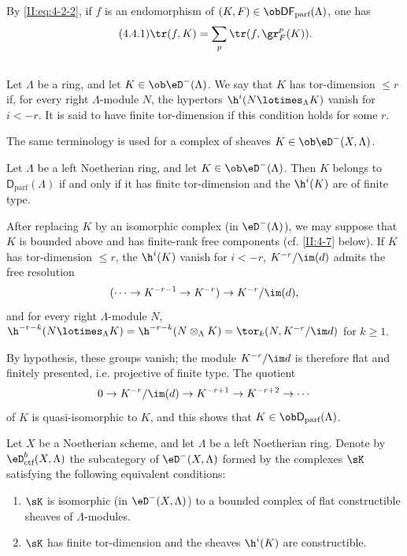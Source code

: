 \documentclass[oneside]{book}
\begin{document}
By \eqref{II:eq:4-2-2}, if $f$ is an endomorphism of
$(K,F)\in\ob\mathsf{DF}_\text{parf}(\Lambda)$, one has
\begin{equation*}\tag{4.4.1}\label{II:eq:4-4-1}
 \tr(f,K) = \sum_p \tr(f,\gr_F^p(K)) \text{.}
\end{equation*}






\subsection{}\label{II:4-5}

Let $\Lambda$ be a ring, and let $K\in\ob\eD^-(\Lambda)$. We say that $K$
has tor-dimension $\leqslant r$ if, for every right $\Lambda$-module $N$, the
hypertors $\h^i(N\lotimes_\Lambda K)$ vanish for $i<-r$. It is said to have
finite tor-dimension if this condition holds for some $r$.

The same terminology is used for a complex of sheaves
$K\in\ob\eD^-(X,\Lambda)$.






\begin{lemma}\label{II:4-5-1}
Let $\Lambda$ be a left Noetherian ring, and let
$K\in\ob\eD^-(\Lambda)$. Then $K$ belongs to
$\mathsf{D}_\text{parf}(\Lambda)$ if and only if it has finite tor-dimension
and the $\h^i(K)$ are of finite type.
\end{lemma}

After replacing $K$ by an isomorphic complex (in $\eD^-(\Lambda)$), we may
suppose that $K$ is bounded above and has finite-rank free components (cf.
\ref{II:4-7} below). If $K$ has tor-dimension $\leqslant r$, the
$\h^i(K)$ vanish for $i<-r$, $K^{-r}/\im(d)$ admits the free resolution
\[
  (\cdots \to K^{-r-1} \to K^{-r}) \to K^{-r}/\im(d) \text{,}
\]
and for every right $\Lambda$-module $N$,
$\h^{-r-k}(N\lotimes_\Lambda K) = \h^{-r-k}(N\otimes_\Lambda K)
= \tor_k(N,K^{-r}/\im d)$ for $k\geqslant 1$.

By hypothesis, these groups vanish; the module $K^{-r}/\im d$ is therefore
flat and finitely presented, i.e. projective of finite type. The quotient
\[
  0 \to K^{-r}/\im(d) \to K^{-r+1} \to K^{-r+2}\to \cdots
\]
of $K$ is quasi-isomorphic to $K$, and this shows that
$K\in\ob\mathsf{D}_\text{parf}(\Lambda)$.






\begin{prop-def_}\label{II:4-6}
Let $X$ be a Noetherian scheme, and let $\Lambda$ be a left Noetherian ring.
Denote by $\eD_\textnormal{ctf}^b(X,\Lambda)$ the subcategory of
$\eD^-(X,\Lambda)$ formed by the complexes $\sK$ satisfying the following
equivalent conditions:
\begin{enumerate}[\indent i)]
  \item $\sK$ is isomorphic (in $\eD^-(X,\Lambda)$) to a bounded complex of
    flat constructible sheaves of $\Lambda$-modules.
  \item $\sK$ has finite tor-dimension and the sheaves $\h^i(K)$ are
    constructible.
\end{enumerate}
\end{prop-def_}
\end{document}
